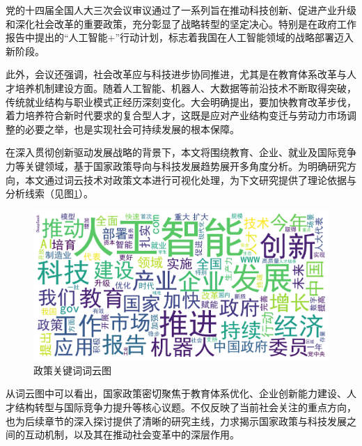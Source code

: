 党的十四届全国人大三次会议审议通过了一系列旨在推动科技创新、促进产业升级和深化社会改革的重要政策，充分彰显了战略转型的坚定决心。特别是在政府工作报告中提出的“人工智能+”行动计划，标志着我国在人工智能领域的战略部署迈入新阶段。

此外，会议还强调，社会改革应与科技进步协同推进，尤其是在教育体系改革与人才培养机制建设方面。随着人工智能、机器人、大数据等前沿技术不断取得突破，传统就业结构与职业模式正经历深刻变化。大会明确提出，要加快教育改革步伐，着力培养符合新时代要求的复合型人才，这既是应对产业结构变迁与劳动力市场调整的必要之举，也是实现社会可持续发展的根本保障。

在深入贯彻创新驱动发展战略的背景下，本文将围绕教育、企业、就业及国际竞争力等关键领域，基于国家政策导向与科技发展趋势展开多角度分析\cite{chen2021beyond}。为明确研究方向，本文通过词云技术对政策文本进行可视化处理，为下文研究提供了理论依据与分析线索（见图\ref{fig:词云}）。

\begin{figure}[H]
    \centering
    \includegraphics[width=0.5\linewidth]{figure/wordcloud_output.png}
    \caption{政策关键词词云图}
    \label{fig:词云}
\end{figure}

从词云图中可以看出，国家政策密切聚焦于教育体系优化、企业创新能力建设、人才结构转型与国际竞争力提升等核心议题。不仅反映了当前社会关注的重点方向，也为后续章节的深入探讨提供了清晰的研究主线，力求揭示国家政策与科技发展之间的互动机制，以及其在推动社会变革中的深层作用。

